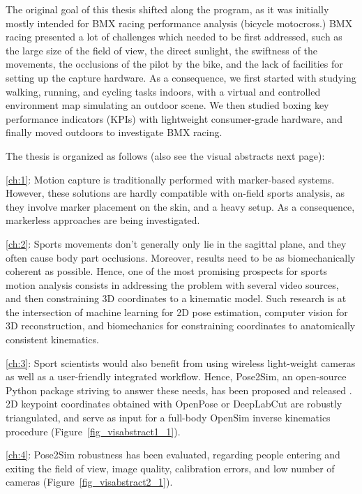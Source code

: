 The original goal of this thesis shifted along the program, as it was initially mostly intended for BMX racing performance analysis (bicycle motocross.) BMX racing presented a lot of challenges which needed to be first addressed, such as the large size of the field of view, the direct sunlight, the swiftness of the movements, the occlusions of the pilot by the bike, and the lack of facilities for setting up the capture hardware. As a consequence, we first started with studying walking, running, and cycling tasks indoors, with a virtual and controlled environment map simulating an outdoor scene. We then studied boxing key performance indicators (KPIs) with lightweight consumer-grade hardware, and finally moved outdoors to investigate BMX racing.

\vspace*{0.2cm}

The thesis is organized as follows (also see the visual abstracts next page):

\noindent\autoref{ch:1}: Motion capture is traditionally performed with marker-based systems. However, these solutions are hardly compatible with on-field sports analysis, as they involve marker placement on the skin, and a heavy setup. As a consequence, markerless approaches are being investigated. 

\noindent\autoref{ch:2}: Sports movements don’t generally only lie in the sagittal plane, and they often cause body part occlusions. Moreover, results need to be as biomechanically coherent as possible. Hence, one of the most promising prospects for sports motion analysis consists in addressing the problem with several video sources, and then constraining 3D coordinates to a kinematic model.  Such research is at the intersection of machine learning for 2D pose estimation, computer vision for 3D reconstruction, and biomechanics for constraining coordinates to anatomically consistent kinematics. 

\noindent\autoref{ch:3}: Sport scientists would also benefit from using wireless light-weight cameras as well as a user-friendly integrated workflow. Hence, Pose2Sim, an open-source Python package striving to answer these needs, has been proposed and released \cite{Pagnon2022b}. 2D keypoint coordinates obtained with OpenPose or DeepLabCut are robustly triangulated, and serve as input for a full-body OpenSim inverse kinematics procedure (Figure~\ref{fig_visabstract1_1}).

\noindent\autoref{ch:4}: Pose2Sim robustness has been evaluated, regarding people entering and exiting the field of view, image quality, calibration errors, and low number of cameras \cite{Pagnon2021} (Figure~\ref{fig_visabstract2_1}). 


